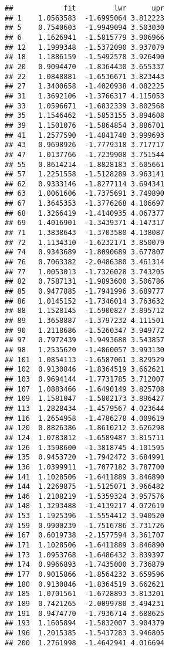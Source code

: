 \documentclass[
]{article}
\begin{document}
\begin{verbatim}
##            fit         lwr      upr
## 1    1.0563583  -1.6995064 3.812223
## 5    0.7540603  -1.9949094 3.503030
## 6    1.1626941  -1.5815779 3.906966
## 12   1.1999348  -1.5372090 3.937079
## 18   1.1886159  -1.5492578 3.926490
## 20   0.9094470  -1.8364430 3.655337
## 22   1.0848881  -1.6536671 3.823443
## 27   1.3400658  -1.4020938 4.082225
## 31   1.3692106  -1.3766317 4.115053
## 33   1.0596671  -1.6832339 3.802568
## 35   1.1546462  -1.5853155 3.894608
## 39   1.1501076  -1.5864854 3.886701
## 41   1.2577590  -1.4841748 3.999693
## 43   0.9698926  -1.7779318 3.717717
## 47   1.0137766  -1.7239908 3.751544
## 55   0.8614214  -1.8828183 3.605661
## 57   1.2251558  -1.5128289 3.963141
## 62   0.9333146  -1.8277114 3.694341
## 63   1.0061606  -1.7375691 3.749890
## 67   1.3645353  -1.3776268 4.106697
## 68   1.3266419  -1.4140935 4.067377
## 69   1.4016901  -1.3439371 4.147317
## 71   1.3838643  -1.3703580 4.138087
## 72   1.1134310  -1.6232171 3.850079
## 74   0.9343689  -1.8090689 3.677807
## 76   0.7063382  -2.0486380 3.461314
## 77   1.0053013  -1.7326028 3.743205
## 82   0.7587131  -1.9893600 3.506786
## 85   0.9477885  -1.7941996 3.689777
## 86   1.0145152  -1.7346014 3.763632
## 88   1.1528145  -1.5900827 3.895712
## 89   1.3658887  -1.3797232 4.111501
## 90   1.2118686  -1.5260347 3.949772
## 97   0.7972439  -1.9493688 3.543857
## 98   1.2535620  -1.4860057 3.993130
## 101  1.0854113  -1.6587061 3.829529
## 102  0.9130846  -1.8364519 3.662621
## 103  0.9694144  -1.7731785 3.712007
## 107  1.0883466  -1.6490149 3.825708
## 109  1.1581047  -1.5802173 3.896427
## 113  1.2828434  -1.4579567 4.023644
## 116  1.2654958  -1.4786278 4.009619
## 120  0.8826386  -1.8610212 3.626298
## 124  1.0783812  -1.6589487 3.815711
## 126  1.3598600  -1.3818745 4.101595
## 135  0.9453720  -1.7942472 3.684991
## 136  1.0399911  -1.7077182 3.787700
## 141  1.1028506  -1.6411889 3.846890
## 144  1.2269875  -1.5125071 3.966482
## 146  1.2108219  -1.5359324 3.957576
## 148  1.3293488  -1.4139217 4.072619
## 153  1.1925396  -1.5554412 3.940520
## 159  0.9900239  -1.7516786 3.731726
## 167  0.6019738  -2.1577594 3.361707
## 171  1.1028506  -1.6411889 3.846890
## 173  1.0953768  -1.6486432 3.839397
## 174  0.9966893  -1.7435000 3.736879
## 177  0.9015866  -1.8564232 3.659596
## 180  0.9130846  -1.8364519 3.662621
## 185  1.0701561  -1.6728893 3.813201
## 189  0.7421265  -2.0099780 3.494231
## 191  0.9474770  -1.7936714 3.688625
## 193  1.1605894  -1.5832007 3.904379
## 196  1.2015385  -1.5437283 3.946805
## 200  1.2761998  -1.4642941 4.016694

\end{verbatim}
\end{document}
